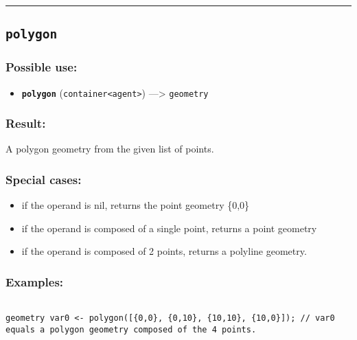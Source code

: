 \documentclass[]{book}
\providecommand{\tightlist}{%
  \setlength{\itemsep}{0pt}\setlength{\parskip}{0pt}}
\theoremstyle{definition}
\theoremstyle{definition}
\theoremstyle{definition}
\theoremstyle{remark}
\begin{document}
\begin{center}\rule{0.5\linewidth}{\linethickness}\end{center}

\subsection{\texorpdfstring{\texttt{polygon}}{polygon}}\label{polygon}

\subsubsection{Possible use:}\label{possible-use-413}

\begin{itemize}
\tightlist
\item
  \textbf{\texttt{polygon}}
  (\texttt{container\textless{}agent\textgreater{}}) ---\textgreater{}
  \texttt{geometry}
\end{itemize}

\subsubsection{Result:}\label{result-399}

A polygon geometry from the given list of points.

\subsubsection{Special cases:}\label{special-cases-111}

\begin{itemize}
\tightlist
\item
  if the operand is nil, returns the point geometry \{0,0\}\\
\item
  if the operand is composed of a single point, returns a point
  geometry\\
\item
  if the operand is composed of 2 points, returns a polyline geometry.
\end{itemize}

\subsubsection{Examples:}\label{examples-287}

\begin{verbatim}
 
geometry var0 <- polygon([{0,0}, {0,10}, {10,10}, {10,0}]); // var0 equals a polygon geometry composed of the 4 points.
\end{verbatim}
\end{document}
